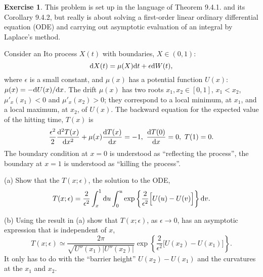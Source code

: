 \documentclass[12pt]{article}
\def\rd{{\rm d}}
\theoremstyle{definition}
\newtheorem{exer}{Exercise}
\theoremstyle{remark}
\begin{document}
\begin{exer}
This problem is set up in the language of 
Theorem 9.4.1. and its Corollary 9.4.2, but
really is about solving a first-order linear ordinary differential 
equation (ODE) and carrying out asymptotic evaluation of
an integral by Laplace's method.

Consider an Ito process $X(t)$ with boundaries, $X\in (0,1)$:
\[
              \rd X(t) = \mu(X)\rd t + \epsilon \rd W(t),
\] 
where $\epsilon$ is a small constant, and $\mu(x)$ has a 
potential function $U(x)$: $\mu(x) = -\rd U(x)/\rd x$.
The drift $\mu(x)$ has two roots $x_1,x_2\in [0,1]$,  $x_1<x_2$, $\mu'_x(x_1) < 0 $ and $\mu'_x(x_2)>0$; they correspond
to a local minimum, at $x_1$, and a local maximum, at $x_2$, of $U(x)$.  The backward equation for the expected value of the 
hitting time, $T(x)$ is
\[
      \frac{\epsilon^2}{2}\frac{\rd^2 T(x)}{\rd x^2}           
         + \mu(x) \frac{\rd T(x)}{\rd x} = -1, \
                \frac{\rd T(0)}{\rd x} = 0, \  T(1) = 0.
\]
The boundary condition at $x=0$ is understood as
``reflecting the process'', the boundary at $x=1$ is understood
as ``killing the process''.

(a) Show that the $T(x;\epsilon)$, the solution to the ODE, 
\[
      T(x;\epsilon) = \frac{2}{\epsilon^2}
         \int_x^1 \rd u \int_0^u  \exp\left\{\frac{2}{\epsilon^2}
           \Big[ U(u) - U(v)\Big]
             \right\} \rd v. 
\]


(b)  Using the result in (a) show that $T(x;\epsilon)$, 
as $\epsilon\to 0$, has an asymptotic expression that is 
independent of $x$,
\[
      T(x;\epsilon) \simeq \frac{2\pi}{\sqrt{U''(x_1)|U''(x_2)|}}
        \exp\left\{\frac{2}{\epsilon^2} \Big[U(x_2)-U(x_1)\Big] \right\}.
\]
It only has to do with the ``barrier height''
$U(x_2)-U(x_1)$ and the curvatures at the $x_1$ and $x_2$.
\end{exer}
\end{document}
